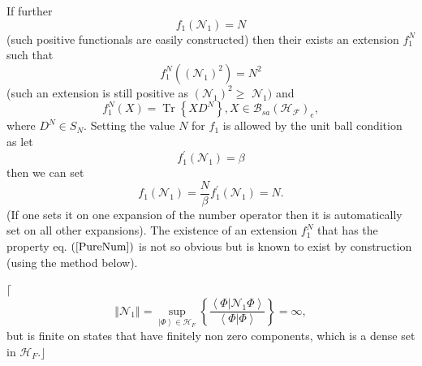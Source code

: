 \documentclass[aps,preprint]{revtex4}%
\begin{document}
If further
\begin{equation}
f_{1}\left(  \mathcal{N}_{1}\right)  =N \label{Trcon}%
\end{equation}
(such positive functionals are easily constructed) then their exists an
extension $f_{1}^{N}$ such that%
\begin{equation}
f_{1}^{N}\left(  \left(  \mathcal{N}_{1}\right)  ^{2}\right)  =N^{2}
\label{PureNum}%
\end{equation}
(such an extension is still positive as $\left(  \mathcal{N}_{1}\right)
^{2}\geq$ $\mathcal{N}_{1})$ and
\begin{equation}
f_{1}^{N}\left(  X\right)  =\operatorname*{Tr}\left\{  XD^{N}\right\}
,X\in\mathcal{B}_{sa}\left(  \mathcal{H}_{\mathcal{F}}\right)  _{e},
\end{equation}
where $D^{N}\in S_{N}.$ Setting the value $N$ for $f_{1}$ is allowed by the
unit ball condition as let
\begin{equation}
f_{1}^{\prime}\left(  \mathcal{N}_{1}\right)  =\beta
\end{equation}
then we can set
\begin{equation}
f_{1}\left(  \mathcal{N}_{1}\right)  =\frac{N}{\beta}f_{1}^{\prime}\left(
\mathcal{N}_{1}\right)  =N.
\end{equation}
(If one sets it on one expansion of the number operator then it is
automatically set on all other expansions). The existence of an extension
$f_{1}^{N}$ that has the property eq. $\left(  \ref{PureNum}\right)  $ is not
so obvious but is known to exist by construction (using the method below).

$\lceil$%
\begin{equation}
\left\Vert \mathcal{N}_{1}\right\Vert =\sup_{\left\vert \Phi\right\rangle
\in\mathcal{H}_{F}}\left\{  \frac{\left\langle \left.  \Phi\right\vert
\mathcal{N}_{1}\Phi\right\rangle }{\left\langle \left.  \Phi\right\vert
\Phi\right\rangle }\right\}  =\infty,
\end{equation}
but is finite on states that have finitely non zero components, which is a
dense set in $\mathcal{H}_{F}$.$\rfloor$
\end{document}
